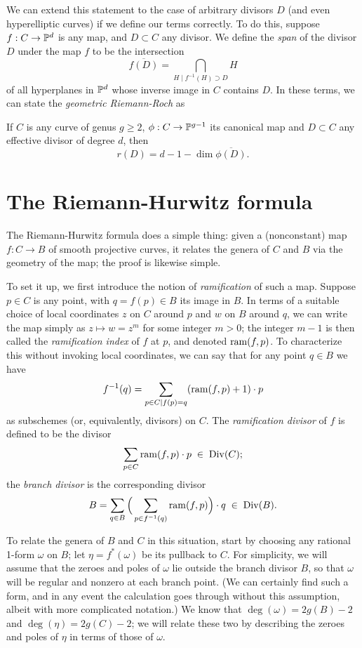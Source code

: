 \documentclass[12pt, leqno]{book}
\begin{document}
We can extend this statement to the case of arbitrary divisors $D$ (and even hyperelliptic curves) if we define our terms correctly. To do this, suppose $f : C \to \PP^d$ is any map, and $D \subset C$ any divisor. We define the \emph{span} of the divisor $D$ under the map $f$ to be the intersection
$$
\overline{f(D)} = \bigcap_{H \mid f^{-1}(H)\supset D} H 
$$
of all hyperplanes in $\PP^d$ whose inverse image in $C$ contains $D$. In these terms, we can state the \emph{geometric Riemann-Roch} as

\begin{theorem}
If $C$ is any curve of genus $g \geq 2$,  $\phi : C \to \PP^{g-1}$ its canonical map and $D \subset C$ any effective divisor of degree $d$, then
$$
r(D) = d - 1 - \dim \overline{\phi(D)}.
$$
\end{theorem}

 \section{The Riemann-Hurwitz formula}
 
 The Riemann-Hurwitz formula does a simple thing: given a (nonconstant) map $f : C \to B$ of smooth projective curves, it relates the genera of $C$ and $B$ via the geometry of the map; the proof is likewise simple.
 
 To set it up, we first introduce the notion of \emph{ramification} of such a map. Suppose $p \in C$ is any point, with $q = f(p) \in B$ its image in $B$. In terms of a suitable choice of local coordinates $z$ on $C$ around $p$ and $w$ on $B$ around $q$, we can write the map simply as $z \mapsto w = z^m$ for some integer $m > 0$; the integer $m-1$ is then called the \emph{ramification index} of $f$ at $p$, and denoted $\ram(f,p)$. To characterize this without invoking local coordinates, we can say that for any point $q \in B$ we have
 $$
 f^{-1}(q) = \sum_{p\in C \mid f(p)=q} (\ram(f,p)+1)\cdot p
 $$
 as subschemes (or, equivalently, divisors) on $C$. The \emph{ramification divisor} of $f$ is defined to be the divisor
 $$
 \sum_{p \in C} \ram(f,p)\cdot p \; \in \;  \Div(C);
 $$
 the \emph{branch divisor} is the corresponding divisor
 $$
 B = \sum_{q \in B} \Big(\sum_{p \in f^{-1}(q)} \ram(f,p) \Big)\cdot q \; \in \; \Div(B).
 $$
 
 To relate the genera of $B$ and $C$ in this situation, start by choosing any rational 1-form $\omega$ on $B$; let $\eta = f^*(\omega)$ be its pullback to $C$. For simplicity, we will assume that the zeroes and poles of $\omega$ lie outside the branch divisor $B$, so that $\omega$ will be regular and nonzero at each branch point. (We can certainly find such a form, and in any event the calculation goes through without this assumption, albeit with more complicated notation.) We know that $\deg(\omega) = 2g(B) - 2$ and $\deg(\eta) = 2g(C) - 2$; we will relate these two by describing the zeroes and poles of $\eta$ in terms of those of $\omega$.
 
\end{document}
